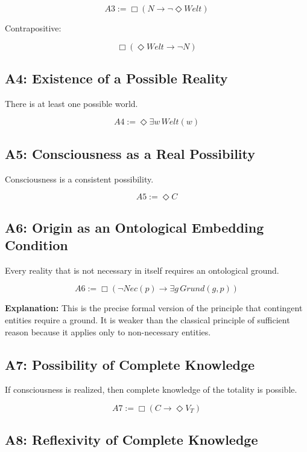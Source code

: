 \documentclass[
]{article}
\begin{document}
\[
\boxed{A3 := \Box(N \rightarrow \neg\Diamond Welt)}
\]

Contrapositive:

\[
\Box(\Diamond Welt \rightarrow \neg N)
\]

\subsection{A4: Existence of a Possible Reality}\label{a4-existence-of-a-possible-reality}

There is at least one possible world.

\[
\boxed{A4 := \Diamond\exists w\, Welt(w)}
\]

\subsection{A5: Consciousness as a Real Possibility}\label{a5-consciousness-as-a-real-possibility}

Consciousness is a consistent possibility.

\[
\boxed{A5 := \Diamond C}
\]

\subsection{A6: Origin as an Ontological Embedding Condition}\label{a6-origin-as-an-ontological-embedding-condition}

Every reality that is not necessary in itself requires an ontological ground.

\[
\boxed{A6 := \Box(\neg Nec(p) \rightarrow \exists g\, Grund(g,p))}
\]

\textbf{Explanation:} This is the precise formal version of the principle that contingent entities require a ground. It is weaker than the classical principle of sufficient reason because it applies only to non-necessary entities.

\subsection{A7: Possibility of Complete Knowledge}\label{a7-possibility-of-complete-knowledge}

If consciousness is realized, then complete knowledge of the totality is possible.

\[
\boxed{A7 := \Box(C \rightarrow \Diamond V_T)}
\]

\subsection{A8: Reflexivity of Complete Knowledge}\label{a8-reflexivity-of-complete-knowledge}
\end{document}

